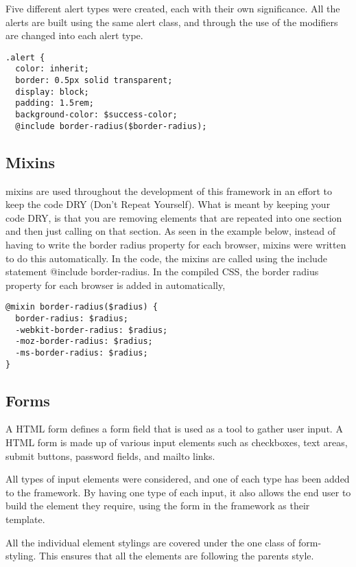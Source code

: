 Five different alert types were created, each with their own significance. All the alerts are built using the same alert class, and through the use of the modifiers are changed into each alert type. 

\begin{lstlisting}[language=CSS3]
.alert {
  color: inherit;
  border: 0.5px solid transparent;
  display: block;
  padding: 1.5rem;
  background-color: $success-color;
  @include border-radius($border-radius);
\end{lstlisting}

\subsection*{Mixins}
\gls{mixins} are used throughout the development of this framework in an effort to keep the code \gls{DRY} (Don't Repeat Yourself). What is meant by keeping your code DRY, is that you are removing elements that are repeated into one section and then just calling on that section. As seen in the example below, instead of having to write the border radius property for each browser, \gls{mixins} were written to do this automatically. In the code, the \gls{mixins} are called using the include statement @include border-radius. In the compiled \gls{CSS}, the border radius property for each browser is added in automatically, 

\begin{lstlisting}[language=CSS3]
@mixin border-radius($radius) {
  border-radius: $radius;
  -webkit-border-radius: $radius;
  -moz-border-radius: $radius;
  -ms-border-radius: $radius;
}
\end{lstlisting}


\newpage
\subsection*{Forms}
A \gls{HTML} form defines a form field that is used as a tool to gather user input. A \gls{HTML} form is made up of various input elements such as checkboxes, text areas, submit buttons, password fields, and mailto links. 

All types of input elements were considered, and one of each type has been added to the framework. By having one type of each input, it also allows the end user to build the element they require, using the form in the framework as their template. 

All the individual element stylings are covered under the one class of form-styling. This ensures that all the elements are following the parents style. 

